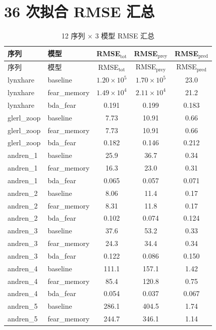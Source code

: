\documentclass[12pt,a4paper]{ctexart}
\begin{document}
\appendix
\section{36 次拟合 RMSE 汇总}
\label{app:fit}

\begin{longtable}{llccc}
  \caption{12 序列 $\times$ 3 模型 RMSE 汇总} \label{tab:fit-full} \\
  \toprule
  序列 & 模型 & RMSE$_{\mathrm{tot}}$ & RMSE$_{\mathrm{prey}}$ & RMSE$_{\mathrm{pred}}$ \\
  \midrule
  \endfirsthead
  \toprule
  序列 & 模型 & RMSE$_{\mathrm{tot}}$ & RMSE$_{\mathrm{prey}}$ & RMSE$_{\mathrm{pred}}$ \\
  \midrule
  \endhead
  lynxhare & baseline & $1.20\times 10^5$ & $1.70\times 10^5$ & 23.0 \\
  lynxhare & fear\_memory & $1.49\times 10^4$ & $2.11\times 10^4$ & 21.2 \\
  lynxhare & bda\_fear & 0.191 & 0.199 & 0.183 \\
  glerl\_zoop & baseline & 7.73 & 10.91 & 0.66 \\
  glerl\_zoop & fear\_memory & 7.73 & 10.91 & 0.66 \\
  glerl\_zoop & bda\_fear & 0.182 & 0.146 & 0.212 \\
  andren\_1 & baseline & 25.9 & 36.7 & 0.34 \\
  andren\_1 & fear\_memory & 16.3 & 23.0 & 0.31 \\
  andren\_1 & bda\_fear & 0.065 & 0.057 & 0.071 \\
  andren\_2 & baseline & 8.06 & 11.4 & 0.17 \\
  andren\_2 & fear\_memory & 8.31 & 11.8 & 0.17 \\
  andren\_2 & bda\_fear & 0.102 & 0.074 & 0.124 \\
  andren\_3 & baseline & 37.6 & 53.2 & 0.33 \\
  andren\_3 & fear\_memory & 24.3 & 34.4 & 0.34 \\
  andren\_3 & bda\_fear & 0.122 & 0.086 & 0.150 \\
  andren\_4 & baseline & 111.1 & 157.1 & 1.42 \\
  andren\_4 & fear\_memory & 85.4 & 120.8 & 0.75 \\
  andren\_4 & bda\_fear & 0.054 & 0.037 & 0.067 \\
  andren\_5 & baseline & 286.1 & 404.5 & 1.74 \\
  andren\_5 & fear\_memory & 244.7 & 346.1 & 1.14 \\

\end{longtable}
\end{document}
